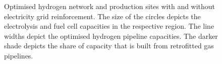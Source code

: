 \begin{figure}
    \centering
    \caption{Optimised hydrogen network and production sites with and without
    electricity grid reinforcement. The size of the circles depicts the
    electrolysis and fuel cell capacities in the respective region. The line
    widths depict the optimised hydrogen pipeline capacities. The darker shade
    depicts the share of capacity that is built from retrofitted gas pipelines.}
    \label{fig:h2-network}
\end{figure}



